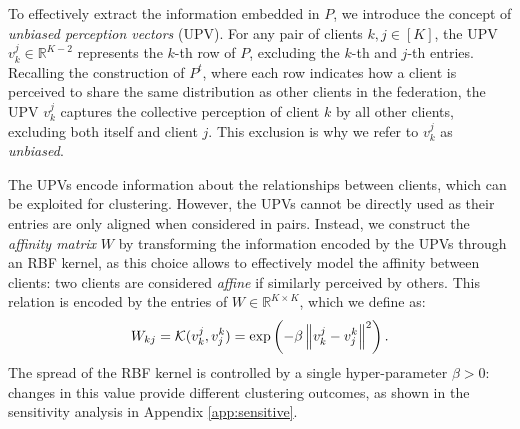 To effectively extract the information embedded in $P$, we introduce the concept of \textit{unbiased perception vectors} (UPV). For any pair of clients $k, j \in [K]$, the UPV $v_k^j \in \mathbb{R}^{K-2}$ represents the $k$-th row of $P$, excluding the $k$-th and $j$-th entries. Recalling the construction of $P^t$, where each row indicates how a client is perceived to share the same distribution as other clients in the federation, the UPV $v_k^j$ captures the collective perception of client $k$ by all other clients, excluding both itself and client $j$. This exclusion is why we refer to $v_k^j$ as \textit{unbiased}. 

The UPVs encode information about the relationships between clients, which can be exploited for clustering. However, the UPVs cannot be directly used as their entries are only aligned when considered in pairs. Instead, we construct the \textit{affinity matrix} $W$ by transforming the information encoded by the UPVs through an RBF kernel, as this choice allows to effectively model the affinity between clients: two clients are considered \textit{affine} if similarly perceived by others. This relation is encoded by the entries of $W \in \mathbb{R}^{K \times K}$, which we define as:
\begin{equation}
    W_{kj} = \mathcal{K}(v_k^j, v_j^k) = \exp\left(-\beta\left\lVert v_k^j-v_j^k\right\rVert^2\right).
\end{equation}
The spread of the RBF kernel is controlled by a single hyper-parameter $\beta>0$: changes in this value provide different clustering outcomes, as shown in the sensitivity analysis in Appendix \ref{app:sensitive}.
\vspace{-1em}
